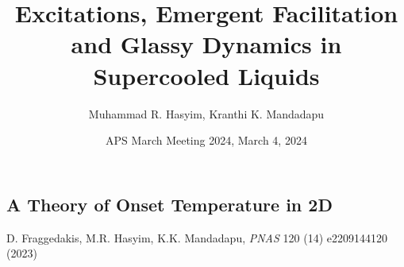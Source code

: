 \documentclass[9pt,professionalfont,t,aspectratio=169]{beamer}
\title{Excitations, Emergent Facilitation and Glassy Dynamics in Supercooled Liquids}
\date{APS March Meeting 2024, March 4, 2024}
\author{Muhammad R. Hasyim\inst{1}, Kranthi K. Mandadapu\inst{2}}
\institute[Affiliations]{
    \inst{1}%
    Department of Chemical and Biomolecular Engineering, University of California, Berkeley, CA 94720
    
    \inst{2}%
    Chemical Division, Lawrence Berkeley National Laboratory, Berkeley, CA 94720
}
\begin{document}
\maketitle 









\begin{frame}
\vspace{20pt}
\section{A Theory of Onset Temperature in 2D}

\centering{}%

D. Fraggedakis, M.R. Hasyim, K.K. Mandadapu, \textit{PNAS} 120 (14) e2209144120 (2023)

\end{frame}















\end{document}
